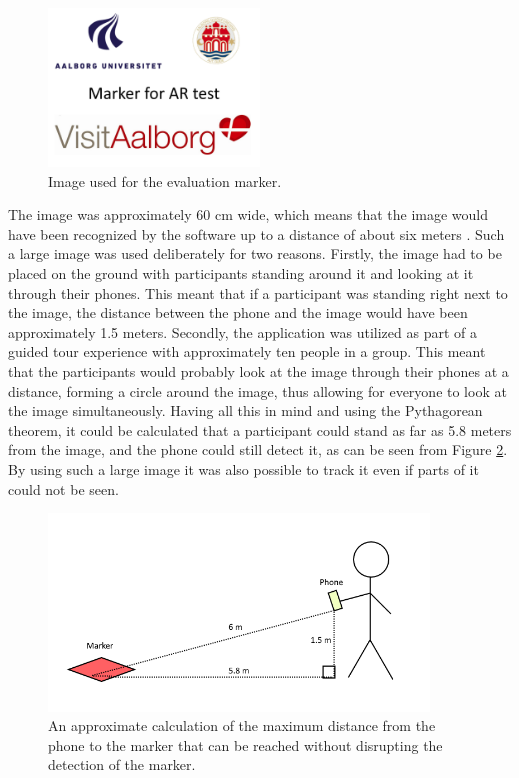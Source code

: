\begin{figure}[h!]
    \centering
    \includegraphics[width=0.5\textwidth]{figures/imp2.png}
    \caption{Image used for the evaluation marker.}\label{fig:imp2}
\end{figure}

The image was approximately 60 cm wide, which means that the image would have been recognized by the software up to a distance of about six meters \cite{calculate_distance_from_image}. Such a large image was used deliberately for two reasons. Firstly, the image had to be placed on the ground with participants standing around it and looking at it through their phones. This meant that if a participant was standing right next to the image, the distance between the phone and the image would have been approximately 1.5 meters. Secondly, the application was utilized as part of a guided tour experience with approximately ten people in a group. This meant that the participants would probably look at the image through their phones at a distance, forming a circle around the image, thus allowing for everyone to look at the image simultaneously. Having all this in mind and using the Pythagorean theorem, it could be calculated that a participant could stand as far as 5.8 meters from the image, and the phone could still detect it, as can be seen from Figure \ref{fig:imp3}. By using such a large image it was also possible to track it even if parts of it could not be seen. 

\begin{figure}[h!]
    \centering
    \includegraphics[width=0.9\textwidth]{figures/imp3.png}
    \caption{An approximate calculation of the maximum distance from the phone to the marker that can be reached without disrupting the detection of the marker.}\label{fig:imp3}
\end{figure}

